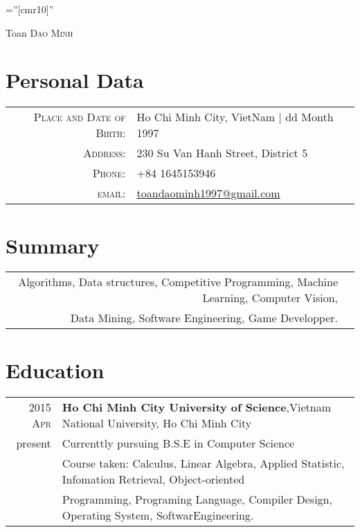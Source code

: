 \documentclass[a4paper,10pt]{article}
\begin{document}

\pagestyle{empty} %

\font\fb=''[cmr10]'' %

\par{\centering
		{\Huge Toan \textsc{Dao Minh}
	}\bigskip\par}

\section{Personal Data}

\begin{tabular}{rl}
    \textsc{Place and Date of Birth:} & Ho Chi Minh City, VietNam  | dd Month 1997 \\
    \textsc{Address:}   & 230 Su Van Hanh Street, District 5 \\
    \textsc{Phone:}     & +84 1645153946\\
    \textsc{email:}     &  \href{mailto:toandaominh1997@gmail.com}{toandaominh1997@gmail.com}
\end{tabular}

\section{Summary}
\begin{tabular}{rl}
 \textsc Algorithms, Data structures, Competitive Programming, Machine Learning, Computer Vision,\\ Data Mining, Software Engineering, Game Developper.
\end{tabular}

\section{Education}
\begin{tabular}{rl}	
 \textsc{2015 Apr} & \textbf{Ho Chi Minh City University of Science},Vietnam National University, Ho Chi Minh City\\
present & Currenttly pursuing B.S.E in Computer Science\\
& Course taken: Calculus, Linear Algebra, Applied Statistic, Infomation Retrieval, Object-oriented\\
& Programming, Programing Language, Compiler Design, Operating System, SoftwarEngineering.\\
\end{tabular}
\end{document}
